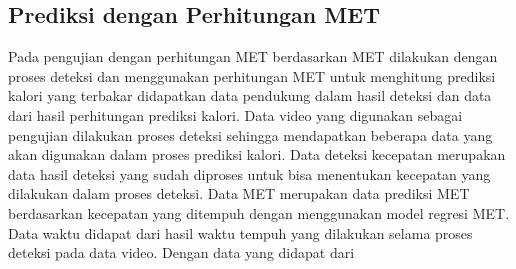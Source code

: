 \subsection{Prediksi dengan Perhitungan MET}
\label{subsec:PengujianPrediksiPerhitungan}



Pada pengujian dengan perhitungan MET berdasarkan MET dilakukan dengan proses deteksi dan menggunakan perhitungan MET untuk menghitung prediksi kalori yang terbakar didapatkan data pendukung dalam hasil deteksi dan data dari hasil perhitungan prediksi kalori. Data video yang digunakan sebagai pengujian dilakukan proses deteksi sehingga mendapatkan beberapa data yang akan digunakan dalam proses prediksi kalori. Data deteksi kecepatan merupakan data hasil deteksi yang sudah diproses untuk bisa menentukan kecepatan yang dilakukan dalam proses deteksi. Data MET merupakan 
data prediksi MET berdasarkan kecepatan yang ditempuh dengan menggunakan model regresi MET. Data waktu didapat dari hasil waktu tempuh yang dilakukan selama proses deteksi pada data video. Dengan data yang didapat dari

